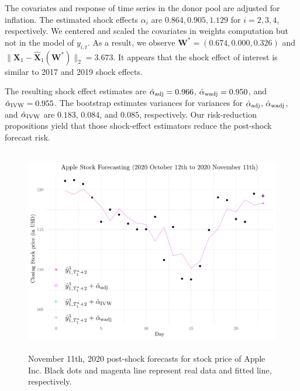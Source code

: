 \documentclass[11pt,3p,review,authoryear]{elsarticle}
\def\mbf#1{\mathbf{#1}} %
\theoremstyle{definition}
\begin{document}
The covariates and response of time series in the donor pool are adjusted for inflation. The estimated shock effects $\alpha_i$ are $0.864, 0.905, 1.129$ for $i = 2, 3, 4$, respectively. We centered and scaled the covariates in weights computation but not in the model of $y_{i,t}$. As a result, we observe $\mathbf{W}^* = (0.674, 0.000, 0.326)$ and $
  \|\mbf{X}_1-\hat{\mbf{X}}_1(\mbf{W}^*)\|_2 = 3.673.
$ It appears that  the shock effect of interest is similar to 2017 and 2019 shock effects. 

The resulting shock effect estimates are $\hat{\alpha}_{\rm adj}= 0.966$, $\hat{\alpha}_{\rm wadj}=0.950$, and $\hat{\alpha}_{\rm IVW} = 0.955$. The bootstrap estimates variances for variances for $\hat{\alpha}_{\rm adj}$, $\hat{\alpha}_{\rm wadj}$,  and $\hat{\alpha}_{\rm IVW}$ are $0.183$, $0.084$, and $0.085$, respectively. Our risk-reduction propositions yield that those shock-effect estimators reduce the post-shock forecast risk.

\begin{figure}[t!]
  \begin{center}
    \includegraphics[height = 9cm]{FIG3.pdf}
    \caption{November 11th, 2020 post-shock forecasts for stock price of Apple Inc. Black dots and magenta line represent real data and fitted line, respectively.}
    \label{Fig3}
  \end{center}  
  \vspace{-.6cm}
\end{figure}
\end{document}
